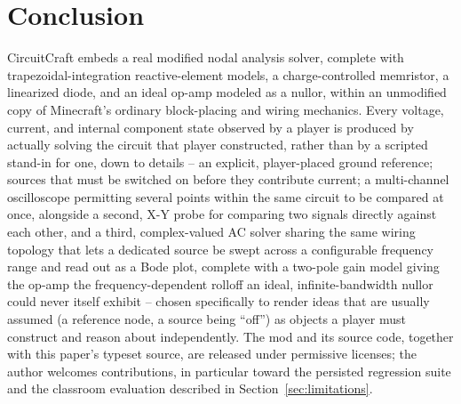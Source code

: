 \section{Conclusion}
\label{sec:conclusion}

CircuitCraft embeds a real modified nodal analysis solver, complete with
trapezoidal-integration reactive-element models, a charge-controlled memristor, a linearized
diode, and an ideal op-amp modeled as a nullor, within an unmodified copy of Minecraft's
ordinary block-placing and wiring mechanics. Every voltage, current, and internal component
state observed by a player is produced by actually solving the circuit that player
constructed, rather than by a scripted stand-in for one, down to details -- an explicit,
player-placed ground reference; sources that must be switched on before they contribute
current; a multi-channel oscilloscope permitting several points within the same circuit to
be compared at once, alongside a second, X-Y probe for comparing two signals directly against
each other, and a third, complex-valued AC solver sharing the same wiring topology that lets a
dedicated source be swept across a configurable frequency range and read out as a Bode plot,
complete with a two-pole gain model giving the op-amp the frequency-dependent rolloff an
ideal, infinite-bandwidth nullor could never itself exhibit -- chosen specifically to render ideas that are usually assumed (a reference node,
a source being ``off'') as objects a player must construct and reason about independently. The mod and its source code, together with this
paper's typeset source, are released under permissive licenses; the author welcomes
contributions, in particular toward the persisted regression suite and the classroom
evaluation described in Section~\ref{sec:limitations}.
